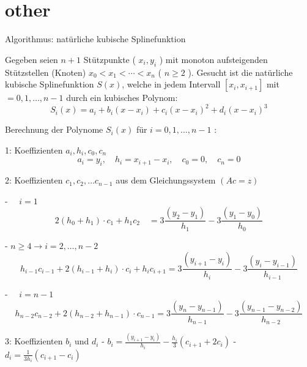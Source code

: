 \section{other}

\begin{KR}{Algorithmus: natürliche kubische Splinefunktion}

    Gegeben seien $n+1$ Stützpunkte ( $x_i, y_i$ ) mit monoton aufsteigenden Stützstellen (Knoten) $x_0<x_1<\cdots<x_n$ ( $n \geq 2$ ). Gesucht ist die natürliche kubische Splinefunktion $S(x)$, welche in jedem Intervall $\left[x_i, x_{i+1}\right]$ mit $=0,1, \ldots, n-1$ durch ein kubisches Polynom:
    $$
    S_i(x)=a_i+b_i\left(x-x_i\right)+c_i\left(x-x_i\right)^2+d_i\left(x-x_i\right)^3
    $$
    
    \tcblower

    Berechnung der Polynome $S_i(x)$ für $i=0,1, \ldots, n-1$ :

    1: Koeffizienten $a_i, h_i, c_0, c_n$
    $$
    a_i=y_i, \quad h_i=x_{i+1}-x_i, \quad c_0=0, \quad c_n=0
    $$


    2: Koeffizienten $c_1, c_2, \ldots c_{n-1}$ aus dem Gleichungssystem $(A c=z)$

    - $\quad i=1$
    $$
    2\left(h_0+h_1\right) \cdot c_1+h_1 c_2 \quad=3 \frac{\left(y_2-y_1\right)}{h_1}-3 \frac{\left(y_1-y_0\right)}{h_0}
    $$

    - $n \geq 4 \rightarrow i=2, \ldots, n-2$
    $$
    h_{i-1} c_{i-1}+2\left(h_{i-1}+h_i\right) \cdot c_i+h_i c_{i+1}=3 \frac{\left(y_{i+1}-y_i\right)}{h_i}-3 \frac{\left(y_i-y_{i-1}\right)}{h_{i-1}}
    $$

    - $\quad i=n-1$
    $$
    h_{n-2} c_{n-2}+2\left(h_{n-2}+h_{n-1}\right) \cdot c_{n-1}=3 \frac{\left(y_n-y_{n-1}\right)}{h_{n-1}}-3 \frac{\left(y_{n-1}-y_{n-2}\right)}{h_{n-2}}
    $$

    3: Koeffizienten $b_i$ und $d_i$
    - $b_i=\frac{\left(y_{i+1}-y_i\right)}{h_i}-\frac{h_i}{3}\left(c_{i+1}+2 c_i\right)$
    - $d_i=\frac{1}{3 h_i}\left(c_{i+1}-c_i\right)$
\end{KR}

